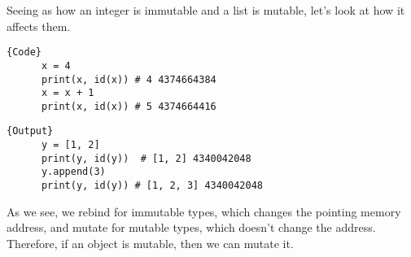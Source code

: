 \documentclass{article}
\begin{document}
    Seeing as how an integer is immutable and a list is mutable, let's look at how it affects them. 

    \noindent\begin{minipage}{.5\textwidth}
    \begin{lstlisting}[]{Code}
      x = 4 
      print(x, id(x)) # 4 4374664384
      x = x + 1
      print(x, id(x)) # 5 4374664416
    \end{lstlisting}
    \end{minipage}
    \hfill
    \begin{minipage}{.49\textwidth}
    \begin{lstlisting}[]{Output}
      y = [1, 2]
      print(y, id(y))  # [1, 2] 4340042048
      y.append(3)
      print(y, id(y)) # [1, 2, 3] 4340042048
    \end{lstlisting}
    \end{minipage}

    As we see, we rebind for immutable types, which changes the pointing memory address, and mutate for mutable types, which doesn't change the address. Therefore, if an object is mutable, then we can mutate it. 
\end{document}
